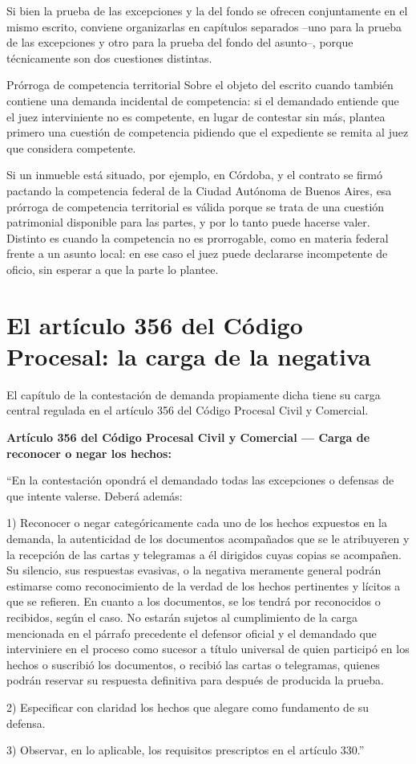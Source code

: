 \documentclass[12pt,oneside]{book}
\begin{document}
Si bien la prueba de las excepciones y la del fondo se ofrecen conjuntamente en el mismo escrito, conviene organizarlas en capítulos separados --uno para la prueba de las excepciones y otro para la prueba del fondo del asunto--, porque técnicamente son dos cuestiones distintas.

\begin{example}{Prórroga de competencia territorial}
Sobre el objeto del escrito cuando también contiene una demanda incidental de competencia: si el demandado entiende que el juez interviniente no es competente, en lugar de contestar sin más, plantea primero una cuestión de competencia pidiendo que el expediente se remita al juez que considera competente.

Si un inmueble está situado, por ejemplo, en Córdoba, y el contrato se firmó pactando la competencia federal de la Ciudad Autónoma de Buenos Aires, esa prórroga de competencia territorial es válida porque se trata de una cuestión patrimonial disponible para las partes, y por lo tanto puede hacerse valer. Distinto es cuando la competencia no es prorrogable, como en materia federal frente a un asunto local: en ese caso el juez puede declararse incompetente de oficio, sin esperar a que la parte lo plantee.
\end{example}

\section{El artículo 356 del Código Procesal: la carga de la negativa}

El capítulo de la contestación de demanda propiamente dicha tiene su carga central regulada en el artículo 356 del Código Procesal Civil y Comercial.

\begin{important}
\textbf{Artículo 356 del Código Procesal Civil y Comercial --- Carga de reconocer o negar los hechos:}

``En la contestación opondrá el demandado todas las excepciones o defensas de que intente valerse. Deberá además:

1) Reconocer o negar categóricamente cada uno de los hechos expuestos en la demanda, la autenticidad de los documentos acompañados que se le atribuyeren y la recepción de las cartas y telegramas a él dirigidos cuyas copias se acompañen. Su silencio, sus respuestas evasivas, o la negativa meramente general podrán estimarse como reconocimiento de la verdad de los hechos pertinentes y lícitos a que se refieren. En cuanto a los documentos, se los tendrá por reconocidos o recibidos, según el caso. No estarán sujetos al cumplimiento de la carga mencionada en el párrafo precedente el defensor oficial y el demandado que interviniere en el proceso como sucesor a título universal de quien participó en los hechos o suscribió los documentos, o recibió las cartas o telegramas, quienes podrán reservar su respuesta definitiva para después de producida la prueba.

2) Especificar con claridad los hechos que alegare como fundamento de su defensa.

3) Observar, en lo aplicable, los requisitos prescriptos en el artículo 330.''
\end{important}
\end{document}
